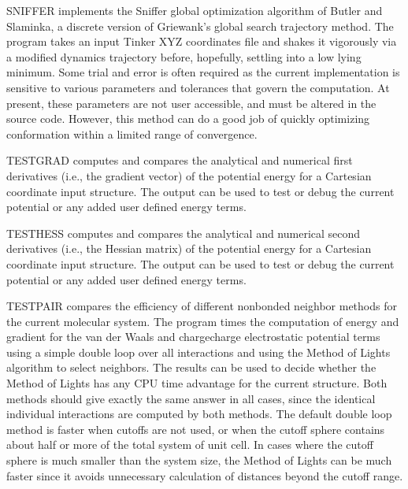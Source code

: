 \documentclass[letterpaper,11pt,english]{sphinxmanual}
\begin{document}
\sphinxAtStartPar
{}

\sphinxAtStartPar
SNIFFER implements the Sniffer global optimization algorithm of Butler and Slaminka, a discrete version of Griewank’s global search trajectory method. The program takes an input Tinker XYZ coordinates file and shakes it vigorously via a modified dynamics trajectory before, hopefully, settling into a low lying minimum. Some trial and error is often required as the current implementation is sensitive to various parameters and tolerances that govern the computation. At present, these parameters are not user accessible, and must be altered in the source code. However, this method can do a good job of quickly optimizing conformation within a limited range of convergence.

\sphinxAtStartPar
{}

\sphinxAtStartPar
TESTGRAD computes and compares the analytical and numerical first derivatives (i.e., the gradient vector) of the potential energy for a Cartesian coordinate input structure. The output can be used to test or debug the current potential or any added user defined energy terms.

\sphinxAtStartPar
{}

\sphinxAtStartPar
TESTHESS computes and compares the analytical and numerical second derivatives (i.e., the Hessian matrix) of the potential energy for a Cartesian coordinate input structure. The output can be used to test or debug the current potential or any added user defined energy terms.

\sphinxAtStartPar
{}

\sphinxAtStartPar
TESTPAIR compares the efficiency of different nonbonded neighbor methods for the current molecular system. The program times the computation of energy and gradient for the van der Waals and charge\sphinxhyphen{}charge electrostatic potential terms using a simple double loop over all interactions and using the Method of Lights algorithm to select neighbors. The results can be used to decide whether the Method of Lights has any CPU time advantage for the current structure. Both methods should give exactly the same answer in all cases, since the identical individual interactions are computed by both methods. The default double loop method is faster when cutoffs are not used, or when the cutoff sphere contains about half or more of the total system of unit cell. In cases where the cutoff sphere is much smaller than the system size, the Method of Lights can be much faster since it avoids unnecessary calculation of distances beyond the cutoff range.
\end{document}
